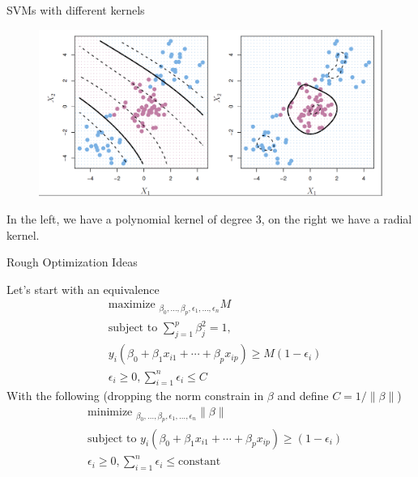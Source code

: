 \documentclass{beamer}
\begin{document}
\begin{frame}{SVMs with different kernels}
			\begin{figure}[h]
		\centering
		\includegraphics[scale=0.35]{../../Figures/fig_kernels_svm.png}
	\end{figure}
In the left, we have a polynomial kernel of degree 3, on the right we have a radial kernel.
\end{frame}


\begin{frame}{Rough Optimization Ideas}
	
	
	Let's start with an equivalence
		\begin{equation*}
		\begin{split}
			&\textrm{maximize }_{\beta_0,\ldots, \beta_p,\epsilon_1,\ldots,\epsilon_n} M \\
			&\textrm{subject to } \sum_{j=1}^p \beta_j^2 =1 , \\
			& y_i (\beta_0 + \beta_1 x_{i1}+ \cdots + \beta_p x_{ip} )\ge M (1-\epsilon_i) \\
			& \epsilon_i \ge 0, \sum_{i=1}^n \epsilon_i \le C 
		\end{split}
	\end{equation*}
With the following (dropping the norm constrain in $\beta$ and define $C=1/\| \beta \|$)
		\begin{equation}
		\begin{split}
			&\textrm{minimize }_{\beta_0,\ldots, \beta_p,\epsilon_1,\ldots,\epsilon_n} \| \beta \| \\
			&\textrm{subject to }  y_i (\beta_0 + \beta_1 x_{i1}+ \cdots + \beta_p x_{ip} )\ge  (1-\epsilon_i) \\
			& \epsilon_i \ge 0, \sum_{i=1}^n \epsilon_i \le \textrm{constant} 
		\end{split}
	\label{eq:optimization}
	\end{equation}
\end{frame}
\end{document}
